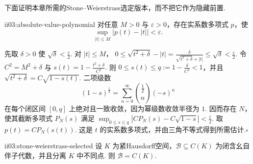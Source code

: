 下面证明本章所需的Stone--Weierstrass选定版本，而不把它作为隐藏前置.

\begin{FALemma}[C][绝对值的一致多项式逼近]{ii03:absolute-value-polynomial}
对任意 \(\displaystyle M>0\) 与 \(\displaystyle\varepsilon>0\)，存在实系数多项式 \(\displaystyle p\)，使
\[
\sup_{|t|\leqslant M}|p(t)-|t||<\varepsilon.
\]
\end{FALemma}

\begin{FAProof}
先取 \(\displaystyle\delta>0\) 使 \(\displaystyle\sqrt\delta<\frac{\varepsilon}{2}\). 对 \(\displaystyle |t|\leqslant M\)，
\(\displaystyle 0\leqslant\sqrt{t^2+\delta}-|t| =\frac{\delta}{\sqrt{t^2+\delta}+|t|} \leqslant\sqrt\delta <\frac{\varepsilon}{2}.\)
令 \(\displaystyle C^2=M^2+\delta\) 与
\(\displaystyle s(t)=1-\frac{t^2+\delta}{C^2}.\)
则 \(\displaystyle0\leqslant s(t)\leqslant q:=1-\frac{\delta}{C^2}<1\)，并且
\(\displaystyle \sqrt{t^2+\delta}=C\sqrt{1-s(t)}.\)
二项级数
\[
(1-s)^{\frac{1}{2}}=\sum_{n=0}^{\infty}{\binom{\frac{1}{2}}{n}}(-s)^n
\]
在每个闭区间 \(\displaystyle[0,q]\) 上绝对且一致收敛，因为幂级数收敛半径为 \(\displaystyle1\). 因而存在 \(\displaystyle N\)，使其截断多项式 \(\displaystyle P_N(s)\) 满足
\(\displaystyle \sup_{0\leqslant s\leqslant q}|C P_N(s)-C\sqrt{1-s}|<\frac{\varepsilon}{2}.\)
取 \(\displaystyle p(t)=C P_N(s(t))\). 这是 \(\displaystyle t\) 的实系数多项式，并由三角不等式得到所需估计.\hfill\(\square\)
\end{FAProof}

\begin{FALemma}{ii03:stone-weierstrass-selected}
设 \(\displaystyle K\) 为紧Hausdorff空间，\(\displaystyle\mathcal B\subseteq C(K)\) 为闭含幺自伴子代数，并且分离 \(\displaystyle K\) 中不同点. 则
\(\displaystyle \mathcal B=C(K).\)
\end{FALemma}


